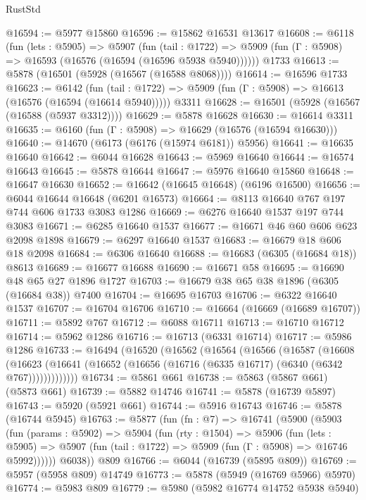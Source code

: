 \begin{lexlean}{RustStd}
\begin{coremodule}
@16594 := @5977 @15860
@16596 := @15862 @16531 @13617
@16608 := @6118
    (fun (lets : @5905) =>
    @5907
      (fun (tail : @1722) =>
      @5909 (fun (Γ : @5908) => @16593 (@16576 (@16594 (@16596 @5938 @5940))))))
    @1733
@16613 := @5878 (@16501 (@5928 (@16567 (@16588 @8068))))
@16614 := @16596 @1733
@16623 := @6142
    (fun (tail : @1722) => @5909 (fun (Γ : @5908) => @16613 (@16576 (@16594 (@16614 @5940)))))
    @3311
@16628 := @16501 (@5928 (@16567 (@16588 (@5937 @3312))))
@16629 := @5878 @16628
@16630 := @16614 @3311
@16635 := @6160 (fun (Γ : @5908) => @16629 (@16576 (@16594 @16630)))
@16640 := @14670 (@6173 (@6176 (@15974 @6181)) @5956)
@16641 := @16635 @16640
@16642 := @6044 @16628
@16643 := @5969 @16640
@16644 := @16574 @16643
@16645 := @5878 @16644
@16647 := @5976 @16640 @15860
@16648 := @16647 @16630
@16652 := @16642 (@16645 @16648) (@6196 @16500)
@16656 := @6044 @16644 @16648 (@6201 @16573)
@16664 := @8113 @16640 @767 @197 @744 @606 @1733 @3083 @1286
@16669 := @6276 @16640 @1537 @197 @744 @3083
@16671 := @6285 @16640 @1537
@16677 := @16671 @46 @60 @606 @623 @2098 @1898
@16679 := @6297 @16640 @1537
@16683 := @16679 @18 @606 @18 @2098
@16684 := @6306 @16640
@16688 := @16683 (@6305 (@16684 @18)) @8613
@16689 := @16677 @16688
@16690 := @16671 @58
@16695 := @16690 @48 @65 @27 @1896 @1727
@16703 := @16679 @38 @65 @38 @1896 (@6305 (@16684 @38)) @7400
@16704 := @16695 @16703
@16706 := @6322 @16640 @1537
@16707 := @16704 @16706
@16710 := @16664 (@16669 (@16689 @16707))
@16711 := @5892 @767
@16712 := @6088 @16711
@16713 := @16710 @16712
@16714 := @5962 @1286
@16716 := @16713 (@6331 @16714)
@16717 := @5986 @1286
@16733 := @16494
    (@16520
      (@16562
        (@16564
          (@16566
            (@16587
              (@16608
                (@16623
                  (@16641 (@16652 (@16656 (@16716 (@6335 @16717) (@6340 (@6342 @767)))))))))))))
@16734 := @5861 @661
@16738 := @5863 (@5867 @661) (@5873 @661)
@16739 := @5882 @14746
@16741 := @5878 (@16739 @5897)
@16743 := @5920 (@5921 @661)
@16744 := @5916 @16743
@16746 := @5878 (@16744 @5945)
@16763 := @5877
    (fun (fn : @7) =>
    @16741
      (@5900
        (@5903
          (fun (params : @5902) =>
          @5904
            (fun (rty : @1504) =>
            @5906
              (fun (lets : @5905) =>
              @5907 (fun (tail : @1722) => @5909 (fun (Γ : @5908) => @16746 @5992))))))
        @6038))
    @809
@16766 := @6044 (@16739 (@5895 @809))
@16769 := @5957 (@5958 @809) @14749
@16773 := @5878 (@5949 (@16769 @5966) @5970)
@16774 := @5983 @809
@16779 := @5980 (@5982 @16774 @14752 @5938 @5940)

\end{coremodule}
\end{lexlean}
